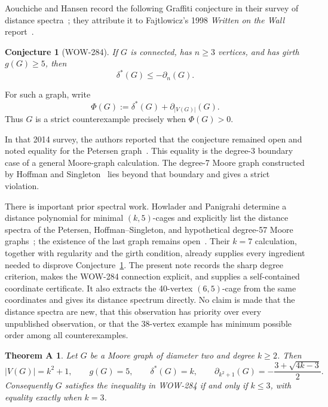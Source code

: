 \documentclass[a4paper,11pt,reqno]{amsart}
\theoremstyle{plain}
\newtheorem*{theoremA}{Theorem A}
\newtheorem{conjecture}[theorem]{Conjecture}
\theoremstyle{definition}
\theoremstyle{remark}
\begin{document}
Aouchiche and Hansen record the following Graffiti conjecture in their survey
of distance spectra~\cite[Conjecture~7.16, p.~370]{AouchicheHansen2014}; they
attribute it to Fajtlowicz's 1998 \emph{Written on the Wall}
report~\cite{Fajtlowicz1998}.

\begin{conjecture}[WOW-284]\label{conj:wow284}
If \(G\) is connected, has \(n\ge3\) vertices, and has girth
\(g(G)\ge5\), then
\[
  \delta^*(G)\le -\partial_n(G).
\]
\end{conjecture}

For such a graph, write
\[
  \Phi(G):=\delta^*(G)+\partial_{|V(G)|}(G).
\]
Thus \(G\) is a strict counterexample precisely when \(\Phi(G)>0\).

In that 2014 survey, the authors reported that the conjecture remained open
and noted equality for the Petersen
graph~\cite[Conjecture~7.16, p.~370]{AouchicheHansen2014}.  This equality is the
degree-3 boundary case of a general Moore-graph calculation.  The degree-7
Moore graph constructed by Hoffman and
Singleton~\cite{HoffmanSingleton1960} lies beyond that boundary and gives a strict
violation.

There is important prior spectral work.  Howlader and Panigrahi determine a
distance polynomial for minimal \((k,5)\)-cages and explicitly list the
distance spectra of the Petersen, Hoffman--Singleton, and hypothetical
degree-57 Moore
graphs~\cite[Theorems~2.3 and~2.5(1)]{HowladerPanigrahi2022}; the existence of the
last graph remains open~\cite{SmithMontemanni2026}.  Their \(k=7\) calculation,
together with regularity and the girth condition, already supplies every
ingredient needed to disprove Conjecture~\ref{conj:wow284}.  The present note
records the sharp degree criterion, makes the WOW-284 connection explicit,
and supplies a self-contained coordinate certificate.  It also extracts the
40-vertex \((6,5)\)-cage from the same coordinates and gives its distance
spectrum directly.  No claim is made that the distance spectra are new, that
this observation has priority over every unpublished observation, or that the
38-vertex example has minimum possible order among all counterexamples.

\label{thm:moore-wow}
\begin{theoremA}
Let \(G\) be a Moore graph of diameter two and degree \(k\ge2\).  Then
\[
 |V(G)|=k^2+1,\qquad g(G)=5,\qquad \delta^*(G)=k,
 \qquad
 \partial_{k^2+1}(G)=-\frac{3+\sqrt{4k-3}}2.
\]
Consequently \(G\) satisfies the inequality in WOW-284 if and only if
\(k\le3\), with equality exactly when \(k=3\).
\end{theoremA}
\end{document}
